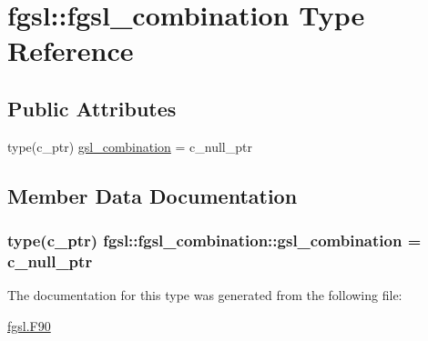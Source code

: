\hypertarget{structfgsl_1_1fgsl__combination}{}\section{fgsl\+:\+:fgsl\+\_\+combination Type Reference}
\label{structfgsl_1_1fgsl__combination}
\subsection*{Public Attributes}
\begin{DoxyCompactItemize}
\item 
type(c\+\_\+ptr) \hyperlink{structfgsl_1_1fgsl__combination_a0b58c1a36b36b76ed2fbac172bd7bd97}{gsl\+\_\+combination} = c\+\_\+null\+\_\+ptr
\end{DoxyCompactItemize}


\subsection{Member Data Documentation}
\hypertarget{structfgsl_1_1fgsl__combination_a0b58c1a36b36b76ed2fbac172bd7bd97}{}
\subsubsection[{gsl\+\_\+combination}]{\setlength{\rightskip}{0pt plus 5cm}type(c\+\_\+ptr) fgsl\+::fgsl\+\_\+combination\+::gsl\+\_\+combination = c\+\_\+null\+\_\+ptr}\label{structfgsl_1_1fgsl__combination_a0b58c1a36b36b76ed2fbac172bd7bd97}


The documentation for this type was generated from the following file\+:\begin{DoxyCompactItemize}
\item 
\hyperlink{fgsl_8F90}{fgsl.\+F90}\end{DoxyCompactItemize}
